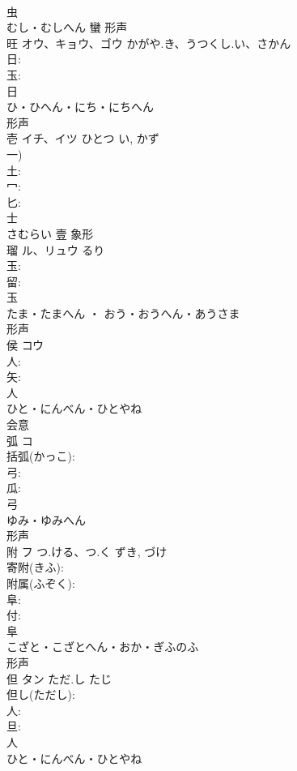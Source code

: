 \documentclass[8pt]{extreport}
\begin{document}
\begin{CJK}{UTF8}{min}
\\	虫	
\\	むし・むしへん	蠻	形声 
\\	旺	オウ、キョウ、ゴウ	かがや.き、うつくし.い、さかん		
\\	日: 
\\	玉: 
\\	日	
\\	ひ・ひへん・にち・にちへん	
\\	形声 
\\	壱	イチ、イツ	ひとつ	い, かず	
\\	一)			
\\	土: 
\\	冖: 
\\	匕: 
\\	士	
\\	さむらい	壹	象形 
\\	瑠	ル、リュウ		るり	
\\	玉: 
\\	留: 
\\	玉	
\\	たま・たまへん ・ おう・おうへん・あうさま	
\\	形声 
\\	侯	コウ			
\\	人: 
\\	矢: 
\\	人	
\\	ひと・にんべん・ひとやね	
\\	会意 
\\	弧	コ			
\\	括弧(かっこ): 
\\	弓: 
\\	瓜: 
\\	弓	
\\	ゆみ・ゆみへん	
\\	形声 
\\	附	フ	つ.ける、つ.く	ずき, づけ	
\\	寄附(きふ): 
\\	附属(ふぞく): 
\\	阜: 
\\	付: 
\\	阜	
\\	こざと・こざとへん・おか・ぎふのふ	
\\	形声 
\\	但	タン	ただ.し	たじ	
\\	但し(ただし): 
\\	人: 
\\	旦: 
\\	人	
\\	ひと・にんべん・ひとやね	

\end{CJK}
\end{document}
